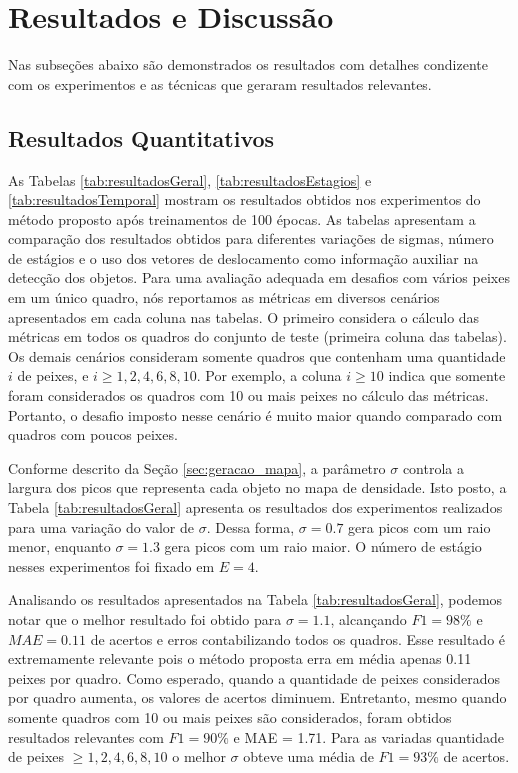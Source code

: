 \section{Resultados e Discussão}
\label{sec:resultados}


Nas subseções abaixo são demonstrados os resultados com detalhes condizente com os experimentos e as técnicas que geraram resultados relevantes.

\subsection{Resultados Quantitativos}
\label{subsec:ResultadosQ}
As Tabelas \ref{tab:resultadosGeral}, \ref{tab:resultadosEstagios} e \ref{tab:resultadosTemporal} mostram os resultados obtidos nos experimentos do método proposto após treinamentos de 100 épocas.
As tabelas apresentam a comparação dos resultados obtidos para diferentes variações de sigmas, número de estágios e o uso dos vetores de deslocamento como informação auxiliar na detecção dos objetos.
Para uma avaliação adequada em desafios com vários peixes em um único quadro, nós reportamos as métricas em diversos cenários apresentados em cada coluna nas tabelas.
O primeiro considera o cálculo das métricas em todos os quadros do conjunto de teste (primeira coluna das tabelas).
Os demais cenários consideram somente quadros que contenham uma quantidade $i$ de peixes, e $i \geq {1,2,4,6,8,10}$.
Por exemplo, a coluna $i \geq 10$ indica que somente foram considerados os quadros com 10 ou mais peixes no cálculo das métricas.
Portanto, o desafio imposto nesse cenário é muito maior quando comparado com quadros com poucos peixes.



Conforme descrito da Seção \ref{sec:geracao_mapa}, a parâmetro $\sigma$ controla a largura dos picos que representa cada objeto no mapa de densidade.
Isto posto, a Tabela \ref{tab:resultadosGeral} apresenta os resultados dos experimentos realizados para uma variação do valor de $\sigma$.
Dessa forma, $\sigma = 0.7$ gera picos com um raio menor, enquanto $\sigma = 1.3$ gera picos com um raio maior.
O número de estágio nesses experimentos foi fixado em $E = 4$.




Analisando os resultados apresentados na Tabela \ref{tab:resultadosGeral}, podemos notar que o melhor resultado foi obtido para $\sigma = 1.1$, alcançando $F1 = 98\%$ e $MAE = 0.11$ de acertos e erros contabilizando todos os quadros.
Esse resultado é extremamente relevante pois o método proposta erra em média apenas 0.11 peixes por quadro.
Como esperado, quando a quantidade de peixes considerados por quadro aumenta, os valores de acertos diminuem.
Entretanto, mesmo quando somente quadros com 10 ou mais peixes são considerados, foram obtidos resultados relevantes com $F1 = 90\%$ e MAE = 1.71.
Para as variadas quantidade de peixes $\geq 1,2,4,6,8,10$ o melhor $\sigma$ obteve uma média de $F1 =  93\%$ de acertos.







